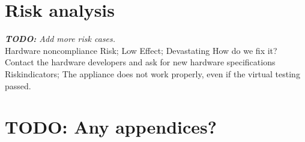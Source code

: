 \documentclass[12pt,titlepage]{article}
\begin{document}

\section{Risk analysis}

\textit{\textbf{TODO:} Add more risk cases.} \\

Hardware noncompliance
Risk; Low
Effect; Devastating
How do we fix it? Contact the hardware developers and ask for new hardware specifications
Riskindicators; The appliance does not work properly, even if the virtual testing passed.


\newpage
\appendix

\section{TODO: Any appendices?}
\label{app:TODO}
\end{document}
